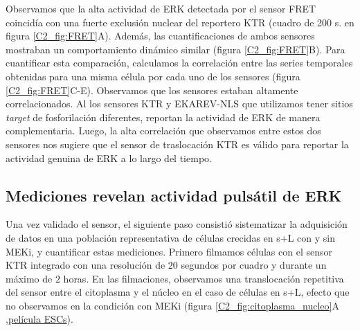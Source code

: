 \documentclass[./main.tex]{subfiles}
\begin{document}
Observamos que la alta actividad de ERK detectada por el sensor FRET coincidía con una fuerte exclusión nuclear del reportero KTR (cuadro de 200 s. en figura \ref{C2_fig:FRET}A). Además, las cuantificaciones de ambos sensores mostraban un comportamiento dinámico similar (figura \ref{C2_fig:FRET}B). Para cuantificar esta comparación, calculamos la correlación entre las series temporales obtenidas para una misma célula por cada uno de los sensores (figura \ref{C2_fig:FRET}C-E). Observamos que los sensores estaban altamente correlacionados. Al los sensores KTR y EKAREV-NLS que utilizamos tener sitios \textit{target} de fosforilación diferentes, reportan la actividad de ERK de manera complementaria. Luego, la alta correlación que observamos entre estos dos sensores nos sugiere que el sensor de traslocación KTR es válido para reportar la actividad genuina de ERK a lo largo del tiempo.  


\subsection{Mediciones revelan actividad pulsátil de ERK}
\label{C2_ssec:tracking}

Una vez validado el sensor, el siguiente paso consistió sistematizar la adquisición de datos en una población representativa de células crecidas en s+L con y sin MEKi, y cuantificar estas mediciones. Primero filmamos células con el sensor KTR integrado con una resolución de $20$ segundos por cuadro y durante un máximo de $2$ horas. En las filmaciones, observamos una translocación repetitiva del sensor entre el citoplasma y el núcleo en el caso de células en s+L, efecto que no observamos en la condición con MEKi (figura \ref{C2_fig:citoplasma_nucleo}A  ,\href{http://movie.biologists.com/video/10.1242/dev.199710/video-1}{película ESCs}). 
\end{document}

